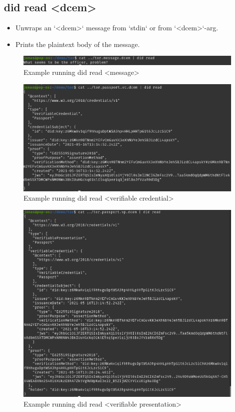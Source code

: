\subsection{did read <dcem>}
\begin{itemize}
\item Unwraps an `<dcem>` message from `stdin` or from `<dcem>`-arg.
\item Prints the plaintext body of the message.
\end{itemize}
    \begin{figure}[htbp]
      \centering
      \includegraphics[width=.65\textwidth]{figures/cmd-read-message.png}
      \caption[]{Example running did read <message>}
    \end{figure}
    \begin{figure}[htbp]
      \centering
      \includegraphics[width=.65\textwidth]{figures/cmd-read-vc.png}
      \caption[]{Example running did read <verifiable credential>}
    \end{figure}
    \begin{figure}[htbp]
      \centering
      \includegraphics[width=.66\textwidth]{figures/cmd-read-vp.png}
      \caption[]{Example running did read <verifiable presentation>}
    \end{figure}

